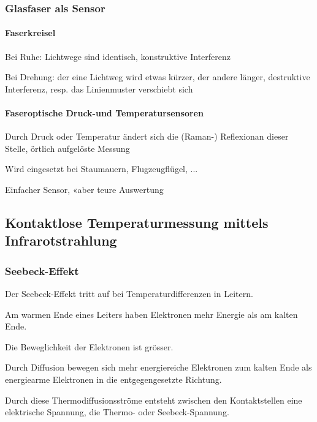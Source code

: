 \subsubsection{Glasfaser als Sensor}
\begin{multicols}{2}
    \paragraph{Faserkreisel}
    \begin{compactitem}
        \item Bei Ruhe: Lichtwege sind identisch, konstruktive Interferenz
        \item Bei Drehung: der eine Lichtweg wird etwas kürzer, der andere länger, destruktive Interferenz, resp. das Linienmuster verschiebt sich
    \end{compactitem}
    
    \paragraph{Faseroptische Druck-und Temperatursensoren}
    \begin{compactitem}
        \item Durch Druck oder Temperatur ändert sich die (Raman-) Reflexionan dieser Stelle, örtlich aufgelöste Messung
        \item Wird eingesetzt bei Staumauern, Flugzeugflügel, ...
        \item Einfacher Sensor, «aber teure Auswertung
    \end{compactitem}
\end{multicols}

\subsection{Kontaktlose Temperaturmessung mittels Infrarotstrahlung}
\subsubsection{Seebeck-Effekt}
\begin{compactitem}
    \item Der Seebeck-Effekt tritt auf bei Temperaturdifferenzen in Leitern.
    \item Am warmen Ende eines Leiters haben Elektronen mehr Energie als am kalten Ende.
    \item Die Beweglichkeit der Elektronen ist grösser.
    \item Durch Diffusion bewegen sich mehr energiereiche Elektronen zum kalten Ende als energiearme Elektronen in die entgegengesetzte Richtung.
    \item Durch diese Thermodiffusionsströme entsteht zwischen den Kontaktstellen eine elektrische Spannung, die Thermo- oder Seebeck-Spannung.
\end{compactitem}